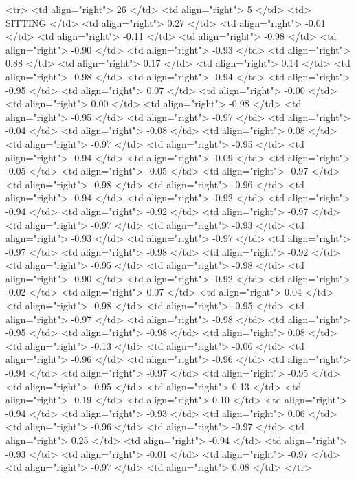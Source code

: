   <tr> <td align="right"> 26 </td> <td align="right">   5 </td> <td> SITTING </td> <td align="right"> 0.27 </td> <td align="right"> -0.01 </td> <td align="right"> -0.11 </td> <td align="right"> -0.98 </td> <td align="right"> -0.90 </td> <td align="right"> -0.93 </td> <td align="right"> 0.88 </td> <td align="right"> 0.17 </td> <td align="right"> 0.14 </td> <td align="right"> -0.98 </td> <td align="right"> -0.94 </td> <td align="right"> -0.95 </td> <td align="right"> 0.07 </td> <td align="right"> -0.00 </td> <td align="right"> 0.00 </td> <td align="right"> -0.98 </td> <td align="right"> -0.95 </td> <td align="right"> -0.97 </td> <td align="right"> -0.04 </td> <td align="right"> -0.08 </td> <td align="right"> 0.08 </td> <td align="right"> -0.97 </td> <td align="right"> -0.95 </td> <td align="right"> -0.94 </td> <td align="right"> -0.09 </td> <td align="right"> -0.05 </td> <td align="right"> -0.05 </td> <td align="right"> -0.97 </td> <td align="right"> -0.98 </td> <td align="right"> -0.96 </td> <td align="right"> -0.94 </td> <td align="right"> -0.92 </td> <td align="right"> -0.94 </td> <td align="right"> -0.92 </td> <td align="right"> -0.97 </td> <td align="right"> -0.97 </td> <td align="right"> -0.93 </td> <td align="right"> -0.93 </td> <td align="right"> -0.97 </td> <td align="right"> -0.97 </td> <td align="right"> -0.98 </td> <td align="right"> -0.92 </td> <td align="right"> -0.95 </td> <td align="right"> -0.98 </td> <td align="right"> -0.90 </td> <td align="right"> -0.92 </td> <td align="right"> -0.02 </td> <td align="right"> 0.07 </td> <td align="right"> 0.04 </td> <td align="right"> -0.98 </td> <td align="right"> -0.95 </td> <td align="right"> -0.97 </td> <td align="right"> -0.98 </td> <td align="right"> -0.95 </td> <td align="right"> -0.98 </td> <td align="right"> 0.08 </td> <td align="right"> -0.13 </td> <td align="right"> -0.06 </td> <td align="right"> -0.96 </td> <td align="right"> -0.96 </td> <td align="right"> -0.94 </td> <td align="right"> -0.97 </td> <td align="right"> -0.95 </td> <td align="right"> -0.95 </td> <td align="right"> 0.13 </td> <td align="right"> -0.19 </td> <td align="right"> 0.10 </td> <td align="right"> -0.94 </td> <td align="right"> -0.93 </td> <td align="right"> 0.06 </td> <td align="right"> -0.96 </td> <td align="right"> -0.97 </td> <td align="right"> 0.25 </td> <td align="right"> -0.94 </td> <td align="right"> -0.93 </td> <td align="right"> -0.01 </td> <td align="right"> -0.97 </td> <td align="right"> -0.97 </td> <td align="right"> 0.08 </td> </tr>
